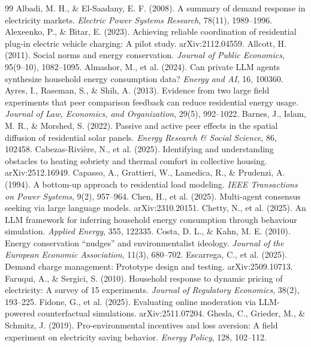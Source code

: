 \documentclass[11pt]{article}
\begin{document}
\begin{thebibliography}{99}
\small
{} Albadi, M. H., \& El-Saadany, E. F. (2008). A summary of demand response in electricity markets. \emph{Electric Power Systems Research}, 78(11), 1989--1996.
 Alexeenko, P., \& Bitar, E. (2023). Achieving reliable coordination of residential plug-in electric vehicle charging: A pilot study. arXiv:2112.04559.
 Allcott, H. (2011). Social norms and energy conservation. \emph{Journal of Public Economics}, 95(9--10), 1082--1095.
 Almashor, M., et al. (2024). Can private LLM agents synthesize household energy consumption data? \emph{Energy and AI}, 16, 100360.
 Ayres, I., Raseman, S., \& Shih, A. (2013). Evidence from two large field experiments that peer comparison feedback can reduce residential energy usage. \emph{Journal of Law, Economics, and Organization}, 29(5), 992--1022.
 Barnes, J., Islam, M. R., \& Morshed, S. (2022). Passive and active peer effects in the spatial diffusion of residential solar panels. \emph{Energy Research \& Social Science}, 86, 102458.
 Cabezas-Rivi\`ere, N., et al. (2025). Identifying and understanding obstacles to heating sobriety and thermal comfort in collective housing. arXiv:2512.16949.
 Capasso, A., Grattieri, W., Lamedica, R., \& Prudenzi, A. (1994). A bottom-up approach to residential load modeling. \emph{IEEE Transactions on Power Systems}, 9(2), 957--964.
 Chen, H., et al. (2025). Multi-agent consensus seeking via large language models. arXiv:2310.20151.
 Chetty, N., et al. (2025). An LLM framework for inferring household energy consumption through behaviour simulation. \emph{Applied Energy}, 355, 122335.
 Costa, D. L., \& Kahn, M. E. (2010). Energy conservation ``nudges'' and environmentalist ideology. \emph{Journal of the European Economic Association}, 11(3), 680--702.
 Escarrega, C., et al. (2025). Demand charge management: Prototype design and testing. arXiv:2509.10713.
 Faruqui, A., \& Sergici, S. (2010). Household response to dynamic pricing of electricity: A survey of 15 experiments. \emph{Journal of Regulatory Economics}, 38(2), 193--225.
 Fidone, G., et al. (2025). Evaluating online moderation via LLM-powered counterfactual simulations. arXiv:2511.07204.
 Ghesla, C., Grieder, M., \& Schmitz, J. (2019). Pro-environmental incentives and loss aversion: A field experiment on electricity saving behavior. \emph{Energy Policy}, 128, 102--112.

\end{thebibliography}
\end{document}
